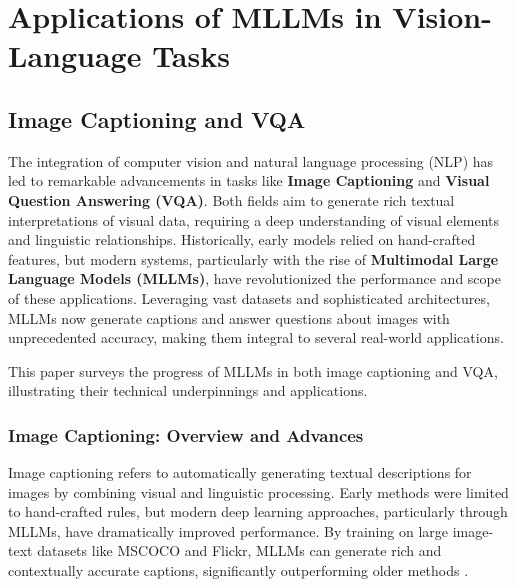 \chapter{Applications of MLLMs in Vision-Language Tasks}



\section{Image Captioning and VQA}
The integration of computer vision and natural language processing (NLP) has led to remarkable advancements in tasks like \textbf{Image Captioning} and \textbf{Visual Question Answering (VQA)}. Both fields aim to generate rich textual interpretations of visual data, requiring a deep understanding of visual elements and linguistic relationships. Historically, early models relied on hand-crafted features, but modern systems, particularly with the rise of \textbf{Multimodal Large Language Models (MLLMs)}, have revolutionized the performance and scope of these applications. Leveraging vast datasets and sophisticated architectures, MLLMs now generate captions and answer questions about images with unprecedented accuracy, making them integral to several real-world applications.

This paper surveys the progress of MLLMs in both image captioning and VQA, illustrating their technical underpinnings and applications.

\subsection{Image Captioning: Overview and Advances}
Image captioning refers to automatically generating textual descriptions for images by combining visual and linguistic processing. Early methods were limited to hand-crafted rules, but modern deep learning approaches, particularly through MLLMs, have dramatically improved performance. By training on large image-text datasets like MSCOCO and Flickr, MLLMs can generate rich and contextually accurate captions, significantly outperforming older methods \cite{icmeta2020m2transformer, icmeta2019oscar, icmeta2020densecap}.

